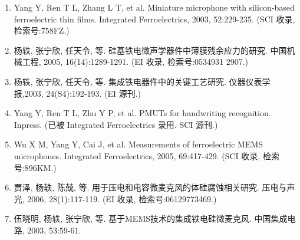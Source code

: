 
\begin{paper}
\begin{enumerate}
	\item Yang Y, Ren T L, Zhang L T, et al. Miniature microphone with silicon-based ferroelectric thin films. Integrated Ferroelectrics, 2003, 52:229-235. (SCI 收录, 检索号:758FZ.)
	\item 杨轶, 张宁欣, 任天令, 等. 硅基铁电微声学器件中薄膜残余应力的研究. 中国机械工程, 2005, 16(14):1289-1291. (EI 收录, 检索号:0534931 2907.)
	\item 杨轶, 张宁欣, 任天令, 等. 集成铁电器件中的关键工艺研究. 仪器仪表学报,2003, 24(S4):192-193. (EI 源刊.)
	\item Yang Y, Ren T L, Zhu Y P, et al. PMUTs for handwriting recognition. Inpress. (已被 Integrated Ferroelectrics 录用. SCI 源刊.)
	\item Wu X M, Yang Y, Cai J, et al. Measurements of ferroelectric MEMS microphones. Integrated Ferroelectrics, 2005, 69:417-429. (SCI 收录, 检索号:896KM.)
	\item 贾泽, 杨轶, 陈兢, 等. 用于压电和电容微麦克风的体硅腐蚀相关研究. 压电与声光, 2006, 28(1):117-119. (EI 收录, 检索号:06129773469.)
	\item 伍晓明, 杨轶, 张宁欣, 等. 基于MEMS技术的集成铁电硅微麦克风. 中国集成电路, 2003, 53:59-61.
\end{enumerate}
\end{paper}
